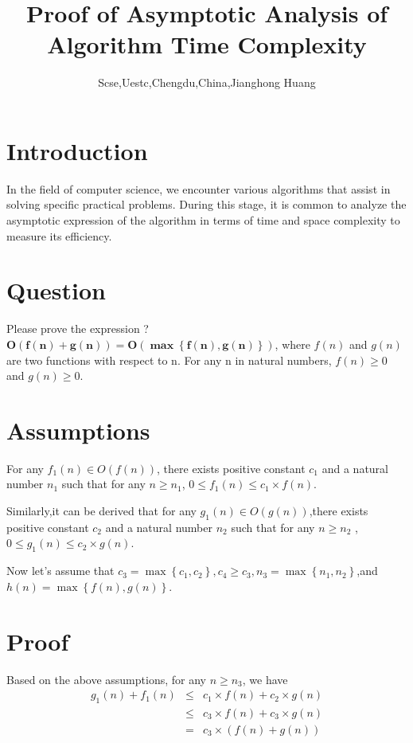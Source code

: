 \documentclass[UTF8]{ctexart}
\title{Proof of Asymptotic Analysis of Algorithm Time Complexity}
\author{Scse,Uestc,Chengdu,China,Jianghong Huang}
\begin{document}
\maketitle


\section{Introduction}
In the field of computer science, we encounter various algorithms 
that assist in solving specific practical problems. During this stage, 
it is common to analyze the asymptotic expression of the algorithm in terms of time 
and space complexity to measure its efficiency.



\section{Question}
Please prove the expression ?$\mathbf {O \left ( f\left ( n \right )   + g\left (  n\right ) \right ) =  O\left ( \max \left \{ f\left ( n \right ), g\left ( n \right )   \right \}  \right )}$,
where $f\left ( n \right )$ and $g\left ( n \right )$  are two functions with respect to n. For any n in natural numbers, $f(n) \geq 0$ and $g(n) \geq 0$.

\section{Assumptions}
For any  $f_1(n)\in O(f(n))$, there exists positive constant $c_1$ and a natural number $n_1$ such that for any $n \geq  n_1$, $0\leq f_1(n)\leq c_1\times f(n)$.


Similarly,it can  be derived that for any $g_1(n)\in O (g(n))$,there exists positive constant $c_2$ and a natural number $n_2$ such that for any $n\geq n_2$ ,$0\leq g_1(n)\leq c_2\times g(n)$.


Now let's assume that $c_3 = \max \left \{ c_1,c_2 \right \} , c_4 \geq c_3, n_3 =\max \left \{ n_1,n_2 \right \}$,and  $h(n) = \max \left \{ f(n),g(n) \right \} $.


\section{Proof}
Based on the above assumptions, for any $n \geq n_3$, we have
\begin{eqnarray} 
g_1(n)+f_1(n) &\le& c_1\times f(n)+c_2\times g(n)   \\ 
&\le& c_3\times f(n)+c_3\times g(n) \nonumber \\
&=& c_3\times\left ( f(n)+g(n) \right ) 
\end{eqnarray}
\end{document}
